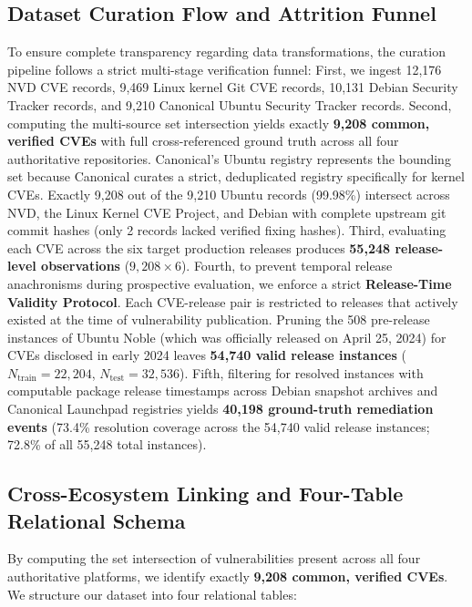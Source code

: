 \documentclass[final,5p,times,twocolumn]{elsarticle}
\begin{document}
\subsection{Dataset Curation Flow and Attrition Funnel}
To ensure complete transparency regarding data transformations, the curation pipeline follows a strict multi-stage verification funnel:
First, we ingest 12,176 NVD CVE records, 9,469 Linux kernel Git CVE records, 10,131 Debian Security Tracker records, and 9,210 Canonical Ubuntu Security Tracker records.
Second, computing the multi-source set intersection yields exactly \textbf{9,208 common, verified CVEs} with full cross-referenced ground truth across all four authoritative repositories. Canonical's Ubuntu registry represents the bounding set because Canonical curates a strict, deduplicated registry specifically for kernel CVEs. Exactly 9,208 out of the 9,210 Ubuntu records (99.98\%) intersect across NVD, the Linux Kernel CVE Project, and Debian with complete upstream git commit hashes (only 2 records lacked verified fixing hashes).
Third, evaluating each CVE across the six target production releases produces \textbf{55,248 release-level observations} ($9,208 \times 6$).
Fourth, to prevent temporal release anachronisms during prospective evaluation, we enforce a strict \textbf{Release-Time Validity Protocol}. Each CVE-release pair is restricted to releases that actively existed at the time of vulnerability publication. Pruning the 508 pre-release instances of Ubuntu Noble (which was officially released on April 25, 2024) for CVEs disclosed in early 2024 leaves \textbf{54,740 valid release instances} ($N_{\text{train}} = 22,204$, $N_{\text{test}} = 32,536$).
Fifth, filtering for resolved instances with computable package release timestamps across Debian snapshot archives and Canonical Launchpad registries yields \textbf{40,198 ground-truth remediation events} (73.4\% resolution coverage across the 54,740 valid release instances; 72.8\% of all 55,248 total instances).

\subsection{Cross-Ecosystem Linking and Four-Table Relational Schema}
By computing the set intersection of vulnerabilities present across all four authoritative platforms, we identify exactly \textbf{9,208 common, verified CVEs}. We structure our dataset into four relational tables:
\end{document}

